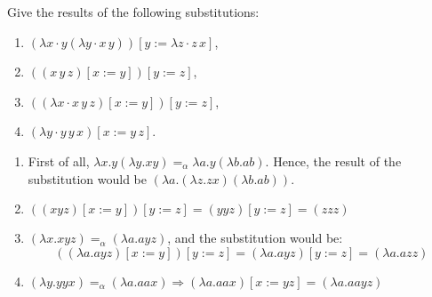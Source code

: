 \begin{problem}{1.5}
    Give the results of the following substitutions:
    \begin{enumerate}[label=$(\alph*)$]
        \item $(\lambda x \cdot y (\lambda y \cdot x \, y)) [y := \lambda z \cdot z \, x]$, 
        \item $((x \, y \, z) [x := y]) [y := z]$, 
        \item $((\lambda x \cdot x \, y \, z) [x := y]) [y := z]$, 
        \item $(\lambda y \cdot y \, y \, x) [x := y \, z]$.
    \end{enumerate}
\end{problem}

\begin{solution}
    \begin{enumerate}[label=$(\alph*)$]
        \item First of all, $\lambda x.y(\lambda y.xy) =_\alpha \lambda a.y(\lambda b.ab)$. Hence, the result of the substitution would be $(\lambda a.(\lambda z.zx)(\lambda b.ab))$.
        \item $ ((xyz)[x := y])[y:=z] = (yyz)[y:=z] = (zzz) $
        \item $ (\lambda x.xyz) =_\alpha (\lambda a.ayz) $, and the substitution would be: $$ ((\lambda a.ayz)[x:=y])[y:=z] = (\lambda a.ayz)[y:=z] = (\lambda a.azz) $$
        \item $ (\lambda y.yyx) =_\alpha (\lambda a.aax) \Rightarrow (\lambda a.aax)[x:=yz] = (\lambda a.aayz) $
    \end{enumerate}
\end{solution}